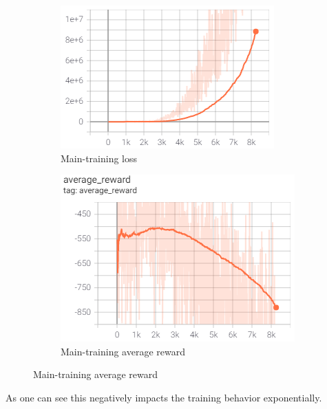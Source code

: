 \begin{figure}[ht]
	\centering
	\begin{subfigure}[b]{0.49\textwidth}
		\centering
		\includegraphics[width=\textwidth]{figures/training3-main-loss-smooth.PNG}
		\caption{Main-training loss}
		\label{fig:main-loss-smoothed-3}
	\end{subfigure}
	\hfill
	\begin{subfigure}[b]{0.49\textwidth}
		\centering
		\includegraphics[width=\textwidth]{figures/training3-main-reward-smooth.PNG}
		\caption{Main-training average reward}
		\label{fig:main-reward-smoothed-3}
	\end{subfigure}
\end{figure}

As one can see this negatively impacts the training behavior exponentially. 
